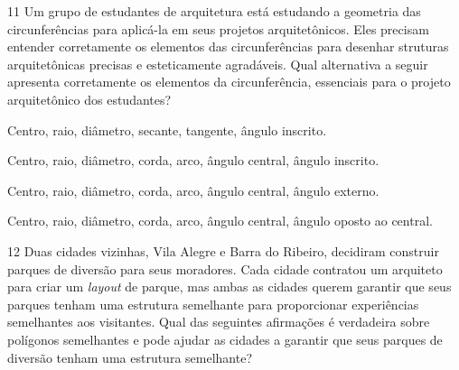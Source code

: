 \num{11} Um grupo de estudantes de arquitetura está estudando a geometria
das circunferências para aplicá-la em seus projetos arquitetônicos. Eles
precisam entender corretamente os elementos das circunferências para desenhar 
struturas arquitetônicas precisas e esteticamente agradáveis. Qual alternativa
a seguir apresenta corretamente os elementos da circunferência, essenciais para
o projeto arquitetônico dos estudantes?

\begin{escolha}
\item Centro, raio, diâmetro, secante, tangente, ângulo inscrito.

\item Centro, raio, diâmetro, corda, arco, ângulo central, ângulo inscrito.

\item Centro, raio, diâmetro, corda, arco, ângulo central, ângulo externo.

\item Centro, raio, diâmetro, corda, arco, ângulo central, ângulo oposto ao central.
\end{escolha}



\num{12} Duas cidades vizinhas, Vila Alegre e Barra do Ribeiro, decidiram
construir parques de diversão para seus moradores. Cada cidade contratou
um arquiteto para criar um \textit{layout} de parque, mas ambas as cidades
querem garantir que seus parques tenham uma estrutura semelhante para proporcionar
experiências semelhantes aos visitantes. Qual das seguintes afirmações é verdadeira
sobre polígonos semelhantes e pode ajudar as cidades a garantir que seus parques
de diversão tenham uma estrutura semelhante?

